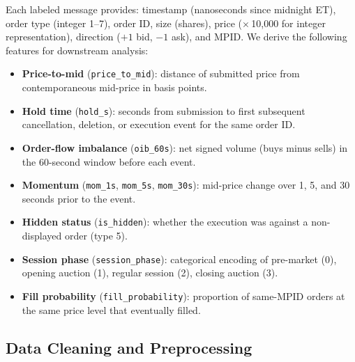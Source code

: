 \documentclass[11pt, letterpaper]{article}
\begin{document}
Each labeled message provides: timestamp (nanoseconds since midnight ET),
order type (integer 1--7), order ID, size (shares), price ($\times$\,10,000
for integer representation), direction ($+1$ bid, $-1$ ask), and MPID.
We derive the following features for downstream analysis:
\begin{itemize}[noitemsep]
  \item \textbf{Price-to-mid} (\texttt{price\_to\_mid}): distance of submitted
    price from contemporaneous mid-price in basis points.
  \item \textbf{Hold time} (\texttt{hold\_s}): seconds from submission to first
    subsequent cancellation, deletion, or execution event for the same order ID.
  \item \textbf{Order-flow imbalance} (\texttt{oib\_60s}): net signed volume
    (buys minus sells) in the 60-second window before each event.
  \item \textbf{Momentum} (\texttt{mom\_1s}, \texttt{mom\_5s}, \texttt{mom\_30s}):
    mid-price change over 1, 5, and 30 seconds prior to the event.
  \item \textbf{Hidden status} (\texttt{is\_hidden}): whether the execution
    was against a non-displayed order (type 5).
  \item \textbf{Session phase} (\texttt{session\_phase}): categorical encoding
    of pre-market (0), opening auction (1), regular session (2), closing
    auction (3).
  \item \textbf{Fill probability} (\texttt{fill\_probability}): proportion of
    same-MPID orders at the same price level that eventually filled.
\end{itemize}

\subsection{Data Cleaning and Preprocessing}
\end{document}
